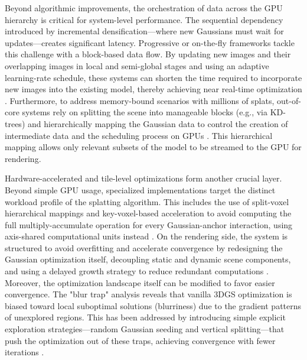 \documentclass[11pt,a4paper]{article}
\begin{document}
Beyond algorithmic improvements, the orchestration of data across the GPU hierarchy is critical for system-level performance. The sequential dependency introduced by incremental densification---where new Gaussians must wait for updates---creates significant latency. Progressive or on-the-fly frameworks tackle this challenge with a block-based data flow. By updating new images and their overlapping images in local and semi-global stages and using an adaptive learning-rate schedule, these systems can shorten the time required to incorporate new images into the existing model, thereby achieving near real-time optimization \cite{arxiv:2410.15629v2}. Furthermore, to address memory-bound scenarios with millions of splats, out-of-core systems rely on splitting the scene into manageable blocks (e.g., via KD-trees) and hierarchically mapping the Gaussian data to control the creation of intermediate data and the scheduling process on GPUs \cite{arxiv:2410.15629v2}. This hierarchical mapping allows only relevant subsets of the model to be streamed to the GPU for rendering.

Hardware-accelerated and tile-level optimizations form another crucial layer. Beyond simple GPU usage, specialized implementations target the distinct workload profile of the splatting algorithm. This includes the use of split-voxel hierarchical mappings and key-voxel-based acceleration to avoid computing the full multiply-accumulate operation for every Gaussian-anchor interaction, using axis-shared computational units instead \cite{arxiv:2607.03209v1}. On the rendering side, the system is structured to avoid overfitting and accelerate convergence by redesigning the Gaussian optimization itself, decoupling static and dynamic scene components, and using a delayed growth strategy to reduce redundant computations \cite{arxiv:2506.02751v3}. Moreover, the optimization landscape itself can be modified to favor easier convergence. The "blur trap" analysis reveals that vanilla 3DGS optimization is biased toward local suboptimal solutions (blurriness) due to the gradient patterns of unexplored regions. This has been addressed by introducing simple explicit exploration strategies---random Gaussian seeding and vertical splitting---that push the optimization out of these traps, achieving convergence with fewer iterations \cite{arxiv:2607.17965v1}.
\end{document}
